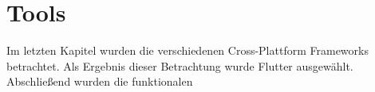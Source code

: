 \chapter{Tools}
\label{ch:tools}
Im letzten Kapitel wurden die verschiedenen Cross-Plattform Frameworks betrachtet. Als Ergebnis dieser Betrachtung wurde Flutter ausgewählt. Abschließend wurden die funktionalen  